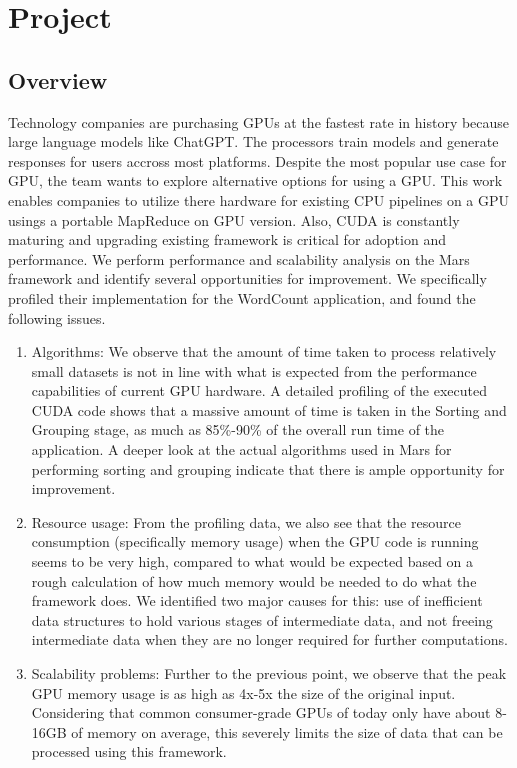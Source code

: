 \documentclass{article}
\begin{document}
\section{Project}
\subsection{Overview}
Technology companies are purchasing GPUs at the fastest rate in history because large language models like ChatGPT. The processors train models and generate responses for users accross most platforms. Despite the most popular use case for GPU, the team wants to explore alternative options for using a GPU. This work enables companies to utilize there hardware for existing CPU pipelines on a GPU usings a portable MapReduce on GPU version. Also, CUDA \cite{cuda-docs} is constantly maturing and upgrading existing framework is critical for adoption and performance. We perform performance and scalability analysis on the Mars framework and identify several opportunities for improvement. We specifically profiled their implementation for the WordCount application, and found the following issues. 
\begin{enumerate}
    \item Algorithms: We observe that the amount of time taken to process relatively small datasets is not in line with what is expected from the performance capabilities of current GPU hardware. A detailed profiling of the executed CUDA code shows that a massive amount of time is taken in the Sorting and Grouping stage, as much as 85\%-90\% of the overall run time of the application. A deeper look at the actual algorithms used in Mars for performing sorting and grouping indicate that there is ample opportunity for improvement.
    \item Resource usage: From the profiling data, we also see that the resource consumption (specifically memory usage) when the GPU code is running seems to be very high, compared to what would be expected based on a rough calculation of how much memory would be needed to do what the framework does. We identified two major causes for this: use of inefficient data structures to hold various stages of intermediate data, and not freeing intermediate data when they are no longer required for further computations. 
    \item Scalability problems: Further to the previous point, we observe that the peak GPU memory usage is as high as 4x-5x the size of the original input. Considering that common consumer-grade GPUs of today only have about 8-16GB of memory on average, this severely limits the size of data that can be processed using this framework. 
\end{enumerate}
\end{document}
